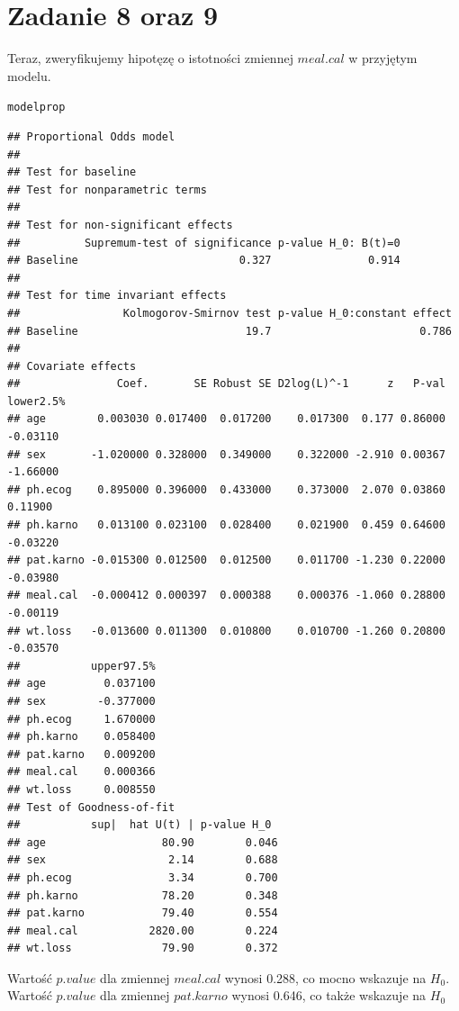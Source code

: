 \documentclass[12pt, a4paper]{article}\usepackage[]{graphicx}\usepackage[]{color}
\makeatletter
\newcommand{\hlstd}[1]{\textcolor[rgb]{0.345,0.345,0.345}{#1}}%
\newenvironment{kframe}{%
 \def\at@end@of@kframe{}%
 \ifinner\ifhmode%
  \def\at@end@of@kframe{\end{minipage}}%
  \begin{minipage}{\columnwidth}%
 \fi\fi%
 \def\FrameCommand##1{\hskip\@totalleftmargin \hskip-\fboxsep
 \colorbox{shadecolor}{##1}\hskip-\fboxsep
     \hskip-\linewidth \hskip-\@totalleftmargin \hskip\columnwidth}%
 \MakeFramed {\advance\hsize-\width
   \@totalleftmargin\z@ \linewidth\hsize
   \@setminipage}}%
 {\par\unskip\endMakeFramed%
 \at@end@of@kframe}
\newenvironment{knitrout}{}{} %
\makeatother
\begin{document}
\section{Zadanie 8 oraz 9}
Teraz, zweryfikujemy hipotęzę o istotności zmiennej $meal.cal$ w przyjętym modelu.
\begin{knitrout}
\color{fgcolor}\begin{kframe}
\begin{alltt}
\hlstd{modelprop}
\end{alltt}
\begin{verbatim}
## Proportional Odds model 
## 
## Test for baseline 
## Test for nonparametric terms 
## 
## Test for non-significant effects 
##          Supremum-test of significance p-value H_0: B(t)=0
## Baseline                         0.327               0.914
## 
## Test for time invariant effects 
##                Kolmogorov-Smirnov test p-value H_0:constant effect
## Baseline                          19.7                       0.786
## 
## Covariate effects 
##               Coef.       SE Robust SE D2log(L)^-1      z   P-val lower2.5%
## age        0.003030 0.017400  0.017200    0.017300  0.177 0.86000  -0.03110
## sex       -1.020000 0.328000  0.349000    0.322000 -2.910 0.00367  -1.66000
## ph.ecog    0.895000 0.396000  0.433000    0.373000  2.070 0.03860   0.11900
## ph.karno   0.013100 0.023100  0.028400    0.021900  0.459 0.64600  -0.03220
## pat.karno -0.015300 0.012500  0.012500    0.011700 -1.230 0.22000  -0.03980
## meal.cal  -0.000412 0.000397  0.000388    0.000376 -1.060 0.28800  -0.00119
## wt.loss   -0.013600 0.011300  0.010800    0.010700 -1.260 0.20800  -0.03570
##           upper97.5%
## age         0.037100
## sex        -0.377000
## ph.ecog     1.670000
## ph.karno    0.058400
## pat.karno   0.009200
## meal.cal    0.000366
## wt.loss     0.008550
## Test of Goodness-of-fit 
##           sup|  hat U(t) | p-value H_0 
## age                  80.90        0.046
## sex                   2.14        0.688
## ph.ecog               3.34        0.700
## ph.karno             78.20        0.348
## pat.karno            79.40        0.554
## meal.cal           2820.00        0.224
## wt.loss              79.90        0.372
\end{verbatim}
\end{kframe}
\end{knitrout}
Wartość $p.value$ dla zmiennej $meal.cal$ wynosi 0.288, co mocno wskazuje na $H_0$.
Wartość $p.value$ dla zmiennej $pat.karno$ wynosi 0.646, co także wskazuje na $H_0$
\end{document}

